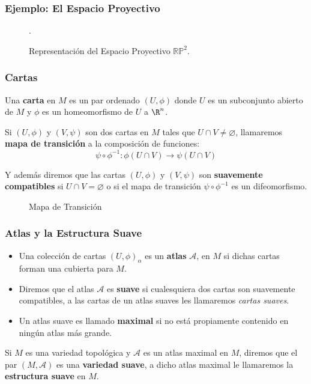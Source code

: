 \begin{frame}
\frametitle{Ejemplo: El Espacio Proyectivo}
\centering
\begin{figure}
  \scalebox{0.75}{}
  \caption{Representación del Espacio Proyectivo $\mathbb{RP}^{2}$.}
.\end{figure}
\end{frame}

\begin{frame}
\frametitle{Cartas}
\begin{definition}[Carta]
  Una \textbf{carta} en $M$ es un par ordenado $(U,\phi)$ donde $U$ es un subconjunto abierto de $M$ y $\phi$ es un homeomorfismo de $U$ a $\R^n$.
\end{definition}\pause

\begin{definition}
  Si $(U,\phi)$ y $(V,\psi)$ son dos cartas en $M$ tales que $U \cap V \neq \varnothing$, llamaremos \textbf{mapa de transición} a la composición de funciones:
  \[ \psi \circ \phi^{-1}: \phi(U \cap V) \to \psi(U \cap V) \]
  
  Y además diremos que las cartas $(U,\phi)$ y $(V,\psi)$ son \textbf{suavemente compatibles} si $U \cap V = \varnothing$ o si el mapa de transición $\psi \circ \phi^{-1}$ es un difeomorfismo.
\end{definition}
\end{frame}

\begin{frame}
  \centering
  \begin{figure}
      
    \caption{Mapa de Transición}
  \end{figure}
\end{frame}

\begin{frame}
  \frametitle{Atlas y la Estructura Suave}
  \begin{definition}
    \begin{itemize}
      \item Una colección de cartas $(U,\phi)_{\alpha}$ es un \textbf{atlas} $\mathcal{A}$, en $M$ si dichas cartas forman una cubierta para $M$.
      \item Diremos que el atlas $\mathcal{A}$ es \textbf{suave} si cualesquiera dos cartas son suavemente compatibles, a las cartas de un atlas suaves les llamaremos \textit{cartas suaves}.
      \item Un atlas suave es llamado \textbf{maximal} si no está propiamente contenido en ningún atlas más grande.
    \end{itemize}
  \end{definition}\pause

  \begin{definition}
    Si $M$ es una variedad topológica y $\mathcal{A}$ es un atlas maximal en $M$, diremos que el par $(M,\mathcal{A})$ es una \textbf{variedad suave}, a dicho atlas maximal le llamaremos la \textbf{estructura suave} en $M$.
  \end{definition}
\end{frame}


